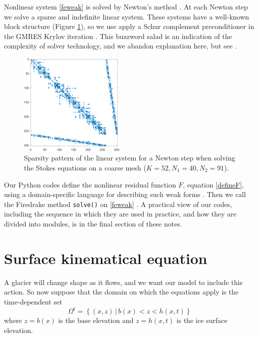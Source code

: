 \documentclass[letterpaper,final,12pt,reqno]{amsart}
\begin{document}
Nonlinear system \eqref{feweak} is solved by Newton's method \cite{BuelerBook,Kelley2003}.  At each Newton step we solve a sparse and indefinite linear system.  These systems have a well-known block structure (Figure \ref{fig:lowspy}), so we use apply a Schur complement preconditioner in the GMRES Krylov iteration \cite{Elmanetal2014,GolubVanLoan2013}.  This buzzword salad is an indication of the complexity of solver technology, and we abandon explanation here, but see \cite[Chapter 14]{BuelerBook}.

\begin{figure}[h]
\includegraphics[width=0.45\textwidth]{lowspy}
\caption{Sparsity pattern of the linear system for a Newton step when solving the Stokes equations on a coarse mesh ($K=52,N_1=40,N_2=91$).}
\label{fig:lowspy}
\end{figure}

Our Python codes define the nonlinear residual function $F$, equation \eqref{defineF}, using a domain-specific language for describing such weak forms \cite{Alnaesetal2014}.  Then we call the Firedrake method \texttt{solve()} on \eqref{feweak} \cite{Rathgeberetal2016}.  A practical view of our codes, including the sequence in which they are used in practice, and how they are divided into modules, is in the final section of these notes.


\section{Surface kinematical equation} \label{sec:kinematical}

A glacier will change shape as it flows, and we want our model to include this action.  So now suppose that the domain on which the equations apply is the time-dependent set
\begin{equation}
\Omega^t = \left\{(x,z)\,\big|\, b(x) < z < h(x,t)\right\}  \label{Omegat}
\end{equation}
where $z=b(x)$ is the base elevation and $z=h(x,t)$ is the ice surface elevation.
\end{document}

